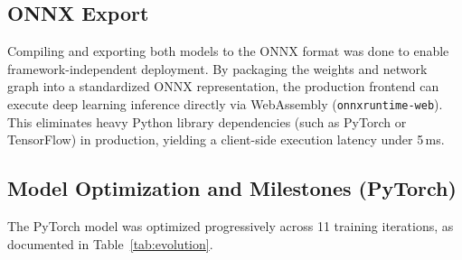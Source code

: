 \documentclass[11pt,a4paper]{article}
\begin{document}
\subsection{ONNX Export}
Compiling and exporting both models to the ONNX format was done to enable framework-independent deployment. By packaging the weights and network graph into a standardized ONNX representation, the production frontend can execute deep learning inference directly via WebAssembly (\texttt{onnxruntime-web}). This eliminates heavy Python library dependencies (such as PyTorch or TensorFlow) in production, yielding a client-side execution latency under 5\,ms.

\subsection{Model Optimization and Milestones (PyTorch)}
The PyTorch model was optimized progressively across 11 training iterations, as documented in Table~\ref{tab:evolution}.
\end{document}
